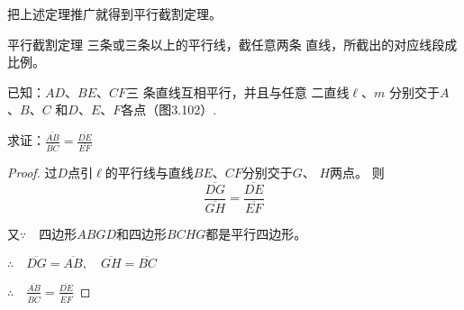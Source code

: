 \begin{figure}
    \begin{minipage}[t]{0.48\linewidth}
    \centering
  \begin{tikzpicture}[>=latex, scale=1]
    \end{tikzpicture}
    \caption{}
    \end{minipage}
    \begin{minipage}[t]{0.48\linewidth}
    \centering
    \begin{tikzpicture}[>=latex, scale=1]
    \end{tikzpicture}
    \caption{}
    \end{minipage}
    \end{figure}



把上述定理推广就得到平行截割定理。

\begin{Theorem}
    {平行截割定理} 三条或三条以上的平行线，截任意两条
直线，所截出的对应线段成比例。
\end{Theorem}

已知：$AD$、$BE$、$CF$三
条直线互相平行，并且与任意
二直线$\ell$、$m$
分别交于$A$、$B$、$C$
和$D$、$E$、$F$各点（图3.102）.

求证：$\frac{\overline{AB}}{\overline{BC}}=\frac{\overline{DE}}{\overline{EF}}$

\begin{proof}
    过$D$点引$\ell$的平行线与直线$BE$、$CF$分别交于$G$、
$H$两点。
则$$\frac{\overline{DG}}{\overline{GH}}=\frac{\overline{DE}}{\overline{EF}}$$

又$\because\quad $四边形$ABGD$和四边形$BCHG$都是平行四边形。

$\therefore\quad\overline{DG}=\overline{AB},\quad \overline{GH}=\overline{BC}$

$\therefore\quad \frac{\overline{AB}}{\overline{BC}}=\frac{\overline{DE}}{\overline{EF}} $
\end{proof}

